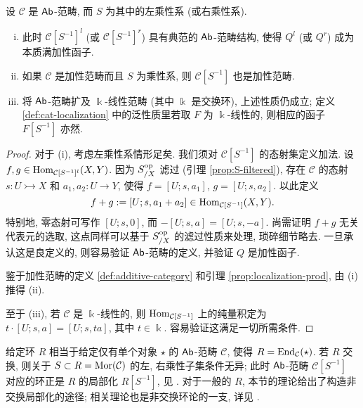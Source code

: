 \begin{theorem}\label{prop:localization-additivity}
	设 $\mathcal{C}$ 是 $\mathsf{Ab}$-范畴, 而 $S$ 为其中的左乘性系 (或右乘性系).
	\begin{enumerate}[(i)]
		\item 此时 $\mathcal{C}[S^{-1}]^l$ (或 $\mathcal{C}[S^{-1}]^r$) 具有典范的 $\mathsf{Ab}$-范畴结构, 使得 $Q^l$ (或 $Q^r$) 成为本质满加性函子.
		\item 如果 $\mathcal{C}$ 是加性范畴而且 $S$ 为乘性系, 则 $\mathcal{C}[S^{-1}]$ 也是加性范畴.
		\item 将 $\mathsf{Ab}$-范畴扩及 $\Bbbk$-线性范畴 (其中 $\Bbbk$ 是交换环), 上述性质仍成立; 定义 \ref{def:cat-localization} 中的泛性质里若取 $F$ 为 $\Bbbk$-线性的, 则相应的函子 $F[S^{-1}]$ 亦然.
	\end{enumerate}
\end{theorem}
\begin{proof}
	对于 (i), 考虑左乘性系情形足矣. 我们须对 $\mathcal{C}[S^{-1}]$ 的态射集定义加法. 设 $f, g \in \operatorname{Hom}_{\mathcal{C}[S^{-1}]^l}(X, Y)$. 因为 $S_{/X}^{\operatorname{op}}$ 滤过 (引理 \ref{prop:S-filtered}), 存在 $\mathcal{C}$ 的态射 $s: U \rightarrowtail X$ 和 $a_1, a_2: U \to Y$, 使得 $f = [U; s, a_1]$, $g = [U; s, a_2]$. 以此定义
	\[ f + g := [U; s, a_1 + a_2] \in \operatorname{Hom}_{\mathcal{C}[S^{-1}]}(X, Y). \]
	特别地, 零态射可写作 $[U; s, 0]$, 而 $-[U; s, a] = [U; s, -a]$. 尚需证明 $f + g$ 无关代表元的选取, 这点同样可以基于 $S_{/X}^{\operatorname{op}}$ 的滤过性质来处理, 琐碎细节略去. 一旦承认这是良定义的, 则容易验证 $\mathsf{Ab}$-范畴的定义, 并验证 $Q$ 是加性函子.
	
	鉴于加性范畴的定义 \ref{def:additive-category} 和引理 \ref{prop:localization-prod}, 由 (i) 推得 (ii).

	至于 (iii), 若 $\mathcal{C}$ 是 $\Bbbk$-线性的, 则 $\operatorname{Hom}_{\mathcal{C}[S^{-1}]}$ 上的纯量积定为 $t \cdot [U; s, a] = [U; s, ta]$, 其中 $t \in \Bbbk$. 容易验证这满足一切所需条件.
\end{proof}

\begin{example}[环的局部化]
	给定环 $R$ 相当于给定仅有单个对象 $\star$ 的 $\mathsf{Ab}$-范畴 $\mathcal{C}$, 使得 $R = \operatorname{End}_{\mathcal{C}}(\star)$. 若 $R$ 交换, 则关于 $S \subset R = \operatorname{Mor}(\mathcal{C})$ 的左, 右乘性子集条件无异; 此时 $\mathsf{Ab}$-范畴 $\mathcal{C}[S^{-1}]$ 对应的环正是 $R$ 的局部化 $R[S^{-1}]$, 见 \cite[\S 5.3]{Li1}. 对于一般的 $R$, 本节的理论给出了构造非交换局部化的途径; 相关理论也是非交换环论的一支, 详见 \cite[\S 10A]{Lam99}.
\end{example}

